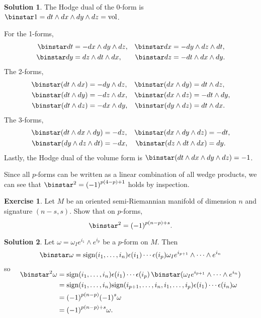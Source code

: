 \documentclass[11pt, a4paper]{report}
\theoremstyle{definition}
\newtheorem{exercise}{Exercise}[part]
\newtheorem{solution}{Solution}[part]
\newenvironment{ex}{\begin{exercise}}{\end{exercise}\pagebreak[1]}
\newenvironment{sol}{\begin{solution}}{\end{solution}\pagebreak[3]}
\renewcommand*{\star}{\ensuremath\mathop{}\mathopen\binstar\mathord{}}
\begin{document}
\begin{sol}

The Hodge dual of the 0-form is $\star 1 = dt \wedge dx \wedge dy \wedge dz = \text{vol}$.

For the 1-forms,
\begin{align*}
    \star dt &= - dx \wedge dy \wedge dz, &
    \star dx &= - dy \wedge dz \wedge dt, \\
    \star dy &= dz \wedge dt \wedge dx, &
    \star dz &= - dt \wedge dx \wedge dy.
\end{align*}
The 2-forms,
\begin{align*}
    \star (dt \wedge dx) &= - dy \wedge dz, &
    \star (dx \wedge dy) &= dt \wedge dz, \\
    \star (dt \wedge dy) &= - dz \wedge dx, &
    \star (dx \wedge dz) &= - dt \wedge dy, \\
    \star (dt \wedge dz) &= - dx \wedge dy, &
    \star (dy \wedge dz) &= dt \wedge dx.
\end{align*}
The 3-forms,
\begin{align*}
    \star(dt \wedge dx \wedge dy) &= - dz, &
    \star(dx \wedge dy \wedge dz) &= - dt, \\
    \star(dy \wedge dz \wedge dt) &= - dx, &
    \star(dz \wedge dt \wedge dx) &= dy.
\end{align*}
Lastly, the Hodge dual of the volume form is $\star (dt \wedge dx \wedge dy \wedge dz) = -1$.

Since all $p$-forms can be written as a linear combination of all wedge products, we can see that $\star^2 = {(-1)}^{p (4 - p) + 1}$ holds by inspection.

\end{sol}

\begin{ex}

Let $M$ be an oriented semi-Riemannian manifold of dimension $n$ and signature $(n-s, s)$. Show that on $p$-forms,
\[
    \star^2 = {(-1)}^{p (n - p) + s}.
\]

\end{ex}

\begin{sol}

Let $\omega = \omega_I e^{i_1} \wedge e^{i_p}$ be a $p$-form on $M$. Then
\[
    \star \omega = \text{sign}(i_1, \ldots, i_n) \epsilon(i_1) \cdots \epsilon(i_p) \omega_I e^{i_{p + 1}} \wedge \cdots \wedge e^{i_n}
\]
so
\begin{align*}
    \SwapAboveDisplaySkip
    \star^2 \omega &= \text{sign}(i_1, \ldots, i_n) \epsilon(i_1) \cdots \epsilon(i_p) \star (\omega_I e^{i_{p + 1}} \wedge \cdots \wedge e^{i_n}) \\
        &= \text{sign}(i_1, \ldots, i_n) \text{sign}(i_{p + 1}, \ldots, i_n, i_1, \ldots, i_p) \epsilon(i_1) \cdots \epsilon(i_n) \omega \\
        &= {(-1)}^{p (n - p)} {(-1)}^s \omega \\
        &= {(-1)}^{p (n - p) + s} \omega.
\end{align*}

\end{sol}
\end{document}
